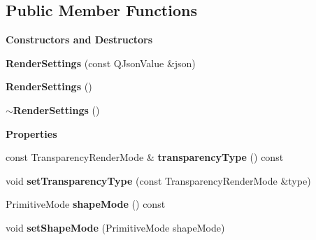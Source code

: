 \subsection*{Public Member Functions}
\begin{Indent}\textbf{ Constructors and Destructors}\par
\begin{DoxyCompactItemize}
\item 
\mbox{\label{classrev_1_1_render_settings_af4f637851f187bd1d03f2faebfff6c6c}} 
{\bfseries Render\+Settings} (const Q\+Json\+Value \&json)
\item 
\mbox{\label{classrev_1_1_render_settings_ac45917dd702aba2777aec75e1450ab23}} 
{\bfseries Render\+Settings} ()
\item 
\mbox{\label{classrev_1_1_render_settings_aee2658ac24feb0b14f768b87e4f5dbe4}} 
{\bfseries $\sim$\+Render\+Settings} ()
\end{DoxyCompactItemize}
\end{Indent}
\begin{Indent}\textbf{ Properties}\par
\begin{DoxyCompactItemize}
\item 
\mbox{\label{classrev_1_1_render_settings_a6b0eacc578a72ea1c5ad4427e3ca3aec}} 
const Transparency\+Render\+Mode \& {\bfseries transparency\+Type} () const
\item 
\mbox{\label{classrev_1_1_render_settings_a2030e2f2554e27c6bb58df52358b330e}} 
void {\bfseries set\+Transparency\+Type} (const Transparency\+Render\+Mode \&type)
\item 
\mbox{\label{classrev_1_1_render_settings_a7ba3eddfa6ebb67e301e50fa0a09dd28}} 
Primitive\+Mode {\bfseries shape\+Mode} () const
\item 
\mbox{\label{classrev_1_1_render_settings_ab6ecb849a5dab4bd27f25cd241a49973}} 
void {\bfseries set\+Shape\+Mode} (Primitive\+Mode shape\+Mode)
\end{DoxyCompactItemize}
\end{Indent}
